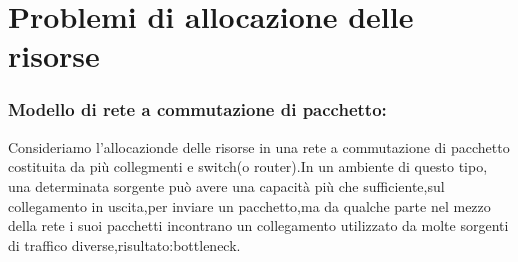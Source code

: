 \section{Problemi di allocazione delle risorse}
\subsubsection{Modello di rete a commutazione di pacchetto:}
Consideriamo l'allocazionde delle risorse in una rete a commutazione di pacchetto costituita da più collegmenti e switch(o router).In un ambiente di questo tipo, una determinata sorgente può avere una capacità più che sufficiente,sul collegamento in uscita,per inviare un pacchetto,ma da qualche parte nel mezzo della rete i suoi pacchetti incontrano un collegamento utilizzato da molte sorgenti di traffico diverse,risultato:bottleneck.
